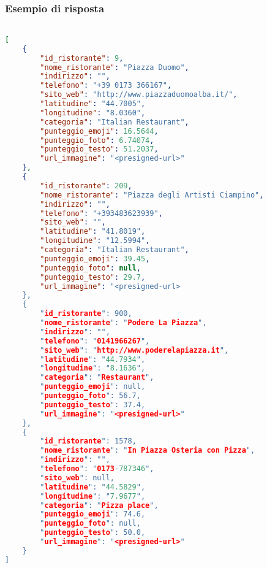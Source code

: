 \subsubsection{Esempio di risposta}
\begin{lstlisting}[language=json]

[
    {
        "id_ristorante": 9,
        "nome_ristorante": "Piazza Duomo",
        "indirizzo": "",
        "telefono": "+39 0173 366167",
        "sito_web": "http://www.piazzaduomoalba.it/",
        "latitudine": "44.7005",
        "longitudine": "8.0360",
        "categoria": "Italian Restaurant",
        "punteggio_emoji": 16.5644,
        "punteggio_foto": 6.74074,
        "punteggio_testo": 51.2037,
        "url_immagine": "<presigned-url>"
    },
    {
        "id_ristorante": 209,
        "nome_ristorante": "Piazza degli Artisti Ciampino",
        "indirizzo": "",
        "telefono": "+393483623939",
        "sito_web": "",
        "latitudine": "41.8019",
        "longitudine": "12.5994",
        "categoria": "Italian Restaurant",
        "punteggio_emoji": 39.45,
        "punteggio_foto": null,
        "punteggio_testo": 29.7,
        "url_immagine": "<presigned-url>
    },
    {
        "id_ristorante": 900,
        "nome_ristorante": "Podere La Piazza",
        "indirizzo": "",
        "telefono": "0141966267",
        "sito_web": "http://www.poderelapiazza.it",
        "latitudine": "44.7934",
        "longitudine": "8.1636",
        "categoria": "Restaurant",
        "punteggio_emoji": null,
        "punteggio_foto": 56.7,
        "punteggio_testo": 37.4,
        "url_immagine": "<presigned-url>"
    },
    {
        "id_ristorante": 1578,
        "nome_ristorante": "In Piazza Osteria con Pizza",
        "indirizzo": "",
        "telefono": "0173-787346",
        "sito_web": null,
        "latitudine": "44.5829",
        "longitudine": "7.9677",
        "categoria": "Pizza place",
        "punteggio_emoji": 74.6,
        "punteggio_foto": null,
        "punteggio_testo": 50.0,
        "url_immagine": "<presigned-url>"
    }
]
\end{lstlisting}

